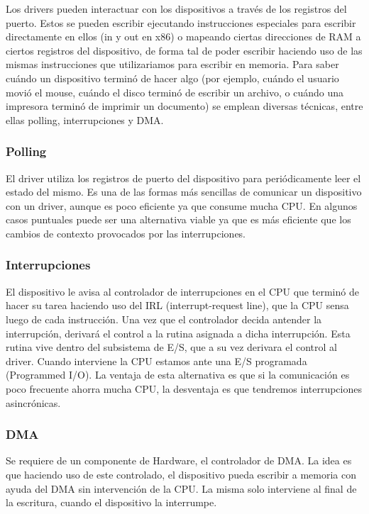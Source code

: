 \documentclass{article}
\begin{document}
Los drivers pueden interactuar con los dispositivos a través de los registros del puerto. Estos se pueden escribir ejecutando instrucciones especiales para escribir directamente en ellos (in y out en x86) o mapeando ciertas direcciones de RAM a ciertos registros del dispositivo, de forma tal de poder escribir haciendo uso de las mismas instrucciones que utilizariamos para escribir en memoria. Para saber cu\'ando un dispositivo terminó de hacer algo (por ejemplo, cu\'ando el usuario movi\'o el mouse, cu\'ando el disco termin\'o de escribir un archivo, o cu\'ando una impresora termin\'o de imprimir un documento) se emplean diversas técnicas, entre ellas polling, interrupciones y DMA.

\subsubsection{Polling}

El driver utiliza los registros de puerto del dispositivo para peri\'odicamente leer el estado del mismo. Es una de las formas m\'as sencillas de comunicar un dispositivo con un driver, aunque es poco eficiente ya que consume mucha CPU. En algunos casos puntuales puede ser una alternativa viable ya que es m\'as eficiente que los cambios de contexto provocados por las interrupciones.

\subsubsection{Interrupciones}

El dispositivo le avisa al controlador de interrupciones en el CPU que termin\'o de hacer su tarea haciendo uso del IRL (interrupt-request line), que la CPU sensa luego de cada instrucción. Una vez que el controlador decida antender la interrupci\'on, derivará el control a la rutina asignada a dicha interrupción. Esta rutina vive dentro del subsistema de E/S, que a su vez derivara el control al driver. Cuando interviene la CPU estamos ante una E/S programada (Programmed I/O). La ventaja de esta alternativa es que si la comunicación es poco frecuente ahorra mucha CPU, la desventaja es que tendremos interrupciones asincrónicas.

\subsubsection{DMA}

Se requiere de un componente de Hardware, el controlador de DMA. La idea es que haciendo uso de este controlado, el dispositivo pueda escribir a memoria con ayuda del DMA sin intervención de la CPU. La misma solo interviene al final de la escritura, cuando el dispositivo la interrumpe.
\end{document}
